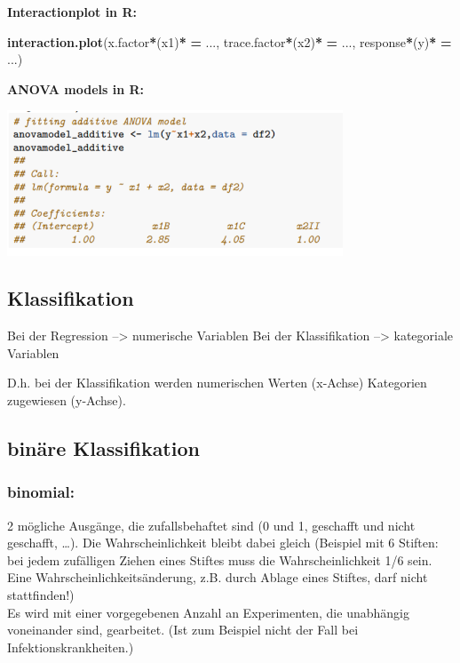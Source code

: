 \documentclass[
]{article}
\newenvironment{Shaded}{\begin{snugshade}}{\end{snugshade}}
\newcommand{\ErrorTok}[1]{\textcolor[rgb]{0.64,0.00,0.00}{\textbf{#1}}}
\newcommand{\FunctionTok}[1]{\textcolor[rgb]{0.13,0.29,0.53}{\textbf{#1}}}
\newcommand{\NormalTok}[1]{#1}
\newcommand{\SpecialCharTok}[1]{\textcolor[rgb]{0.81,0.36,0.00}{\textbf{#1}}}
\begin{document}
\textbf{Interactionplot in R:}

\begin{Shaded}
\begin{Highlighting}[]
\FunctionTok{interaction.plot}\NormalTok{(x.factor}\SpecialCharTok{*}\NormalTok{(x1)}\SpecialCharTok{*} \ErrorTok{=}\NormalTok{ ..., trace.factor}\SpecialCharTok{*}\NormalTok{(x2)}\SpecialCharTok{*} \ErrorTok{=}\NormalTok{ ..., response}\SpecialCharTok{*}\NormalTok{(y)}\SpecialCharTok{*} \ErrorTok{=}\NormalTok{ ...)}
\end{Highlighting}
\end{Shaded}

\textbf{ANOVA models in R:}

\includegraphics[width=10cm, center]{Fig11}

\clearpage

\hypertarget{klassifikation}{%
\subsection{Klassifikation}\label{klassifikation}}

Bei der Regression --\textgreater{} numerische Variablen Bei der
Klassifikation --\textgreater{} kategoriale Variablen

D.h. bei der Klassifikation werden numerischen Werten (x-Achse)
Kategorien zugewiesen (y-Achse).

\hypertarget{binuxe4re-klassifikation}{%
\subsection{binäre Klassifikation}\label{binuxe4re-klassifikation}}

\hypertarget{binomial}{%
\subsubsection{binomial:}\label{binomial}}

2 mögliche Ausgänge, die zufallsbehaftet sind (0 und 1, geschafft und
nicht geschafft, \ldots). Die Wahrscheinlichkeit bleibt dabei gleich
(Beispiel mit 6 Stiften: bei jedem zufälligen Ziehen eines Stiftes muss
die Wahrscheinlichkeit 1/6 sein. Eine Wahrscheinlichkeitsänderung, z.B.
durch Ablage eines Stiftes, darf nicht stattfinden!)\\
Es wird mit einer vorgegebenen Anzahl an Experimenten, die unabhängig
voneinander sind, gearbeitet. (Ist zum Beispiel nicht der Fall bei
Infektionskrankheiten.)
\end{document}
